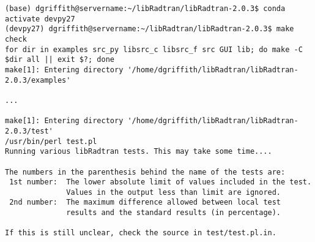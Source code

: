 \begin{enumerate}
\begin{lstlisting}[style=tinysize]
(base) dgriffith@servername:~/libRadtran/libRadtran-2.0.3$ conda activate devpy27
(devpy27) dgriffith@servername:~/libRadtran/libRadtran-2.0.3$ make check
for dir in examples src_py libsrc_c libsrc_f src GUI lib; do make -C $dir all || exit $?; done
make[1]: Entering directory '/home/dgriffith/libRadtran/libRadtran-2.0.3/examples'

...

make[1]: Entering directory '/home/dgriffith/libRadtran/libRadtran-2.0.3/test'
/usr/bin/perl test.pl
Running various libRadtran tests. This may take some time....

The numbers in the parenthesis behind the name of the tests are:
 1st number:  The lower absolute limit of values included in the test.
              Values in the output less than limit are ignored.
 2nd number:  The maximum difference allowed between local test
              results and the standard results (in percentage).

If this is still unclear, check the source in test/test.pl.in.


\end{lstlisting}
\end{enumerate}
